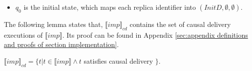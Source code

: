 {\begin {itemize}
\begin{itemize}
    \item[-] Then, $\forall k' \neq r$, if $(dat,r_1,k') \in msgs(k')$, then add $((dat,r_1,k'),k')$.

    \item[-] Make the transitive closure.
    \end{itemize}

\item[-] $q_0$ is the initial state, which maps each replica identifier into $(InitD,\emptyset,\emptyset)$.
\end{itemize}

The following lemma states that, $\llbracket imp \rrbracket_{cd}$ contains the set of causal delivery executions of $\llbracket imp \rrbracket$. Its proof can be found in Appendix \ref{sec:appendix definitions and proofs of section implementation}.

\begin{lemma}
\label{lemma:semantics of imp cd contains the set of causal delivery executions of semantics of imp}

$\llbracket imp \rrbracket_{cd} = \{ t \vert t \in \llbracket imp \rrbracket \wedge t$ satisfies causal delivery $\}$.
\end{lemma}
}
